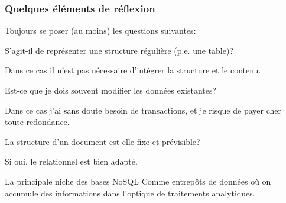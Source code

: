\begin{frame}[fragile]
\frametitle{Quelques éléments de réflexion}


 \alert{Toujours se poser (au moins) les questions suivantes}:

\begin{redbullet}
  \item S'agit-il de représenter une structure régulière (p.e. une table)?
  
    Dans ce cas il n'est pas nécessaire d'intégrer la structure et le contenu.
        
  \item Est-ce que je dois souvent modifier les données existantes?
  
    Dans ce cas j'ai sans doute besoin de transactions, et je risque de payer cher toute redondance.
    
  \item La structure d'un document est-elle fixe et prévisible?
  
  Si oui, le relationnel est bien adapté.
\end{redbullet}

\vfill

\begin{remblock}{La principale niche des bases NoSQL}
Comme entrepôts de données où on accumule des informations dans l'optique de traitements analytiques.
\end{remblock}


\end{frame}



